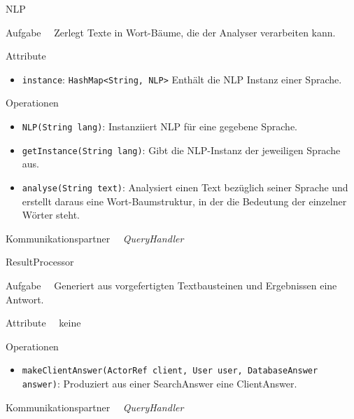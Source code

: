 \begin{class}{50}{NLP}
\item[Aufgabe]~\
Zerlegt Texte in Wort-Bäume, die der Analyser verarbeiten kann.
\item[Attribute]~\
\begin{itemize}
\item \texttt{instance}: \texttt{HashMap<String, NLP>} Enthält die NLP Instanz einer Sprache.
\end{itemize}
\item[Operationen]~\
\begin{itemize}
\item \texttt{NLP(String lang)}: Instanziiert NLP für eine gegebene Sprache.
\item \texttt{getInstance(String lang)}: Gibt die NLP-Instanz der jeweiligen
Sprache aus.
\item \texttt{analyse(String text)}: Analysiert einen Text bezüglich seiner
Sprache und erstellt daraus eine Wort-Baumstruktur, in der die Bedeutung der
einzelner Wörter steht.
\end{itemize}
\item[Kommunikationspartner]~\
\textit{QueryHandler}
\end{class}

\begin{class}{50}{ResultProcessor}
\item[Aufgabe]~\
Generiert aus vorgefertigten Textbausteinen und
Ergebnissen eine Antwort.
\item[Attribute]~\ keine
\item[Operationen]~\
\begin{itemize}
\item \texttt{makeClientAnswer(ActorRef client, User user, DatabaseAnswer
answer)}: Produziert aus einer SearchAnswer eine ClientAnswer.
\end{itemize}
\item[Kommunikationspartner]~\
\textit{QueryHandler}
\end{class}
